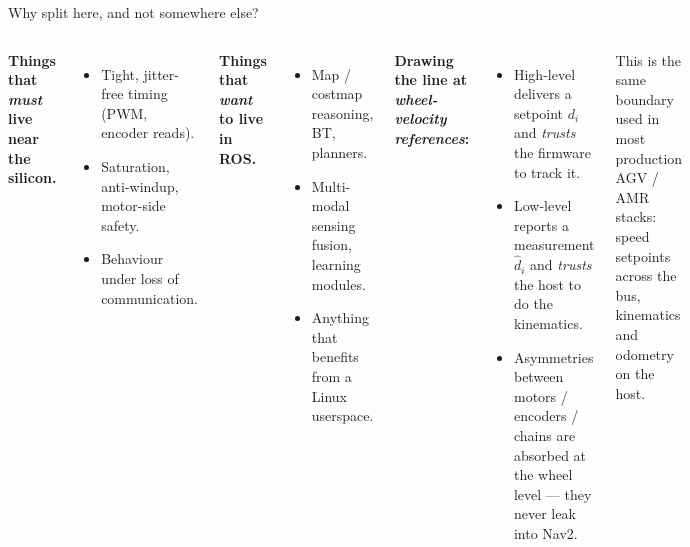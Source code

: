 \begin{frame}{Why split here, and not somewhere else?}
  \begin{columns}[T,onlytextwidth]
      \textbf{Things that \emph{must} live near the silicon.}
      \begin{itemize}\setlength\itemsep{2pt}
        \item Tight, jitter-free timing (PWM, encoder reads).
        \item Saturation, anti-windup, motor-side safety.
        \item Behaviour under loss of communication.
      \end{itemize}

      \textbf{Things that \emph{want} to live in ROS.}
      \begin{itemize}\setlength\itemsep{2pt}
        \item Map / costmap reasoning, BT, planners.
        \item Multi-modal sensing fusion, learning modules.
        \item Anything that benefits from a Linux userspace.
      \end{itemize}

      \textbf{Drawing the line at \emph{wheel-velocity references}:}
      \begin{itemize}\setlength\itemsep{2pt}
        \item \alert{High-level} delivers a setpoint \(d_i\)
              and \emph{trusts} the firmware to track it.
        \item \alert{Low-level} reports a measurement
              \(\hat{d}_i\) and \emph{trusts} the host to do the
              kinematics.
        \item Asymmetries between motors / encoders / chains are absorbed at
              the wheel level — they never leak into Nav2.
      \end{itemize}

      \vspace{0.4em}
      \footnotesize\textcolor{black!60}{This is the same boundary used in
      most production AGV / AMR stacks: speed setpoints across the bus,
      kinematics and odometry on the host.}
  \end{columns}
\end{frame}

